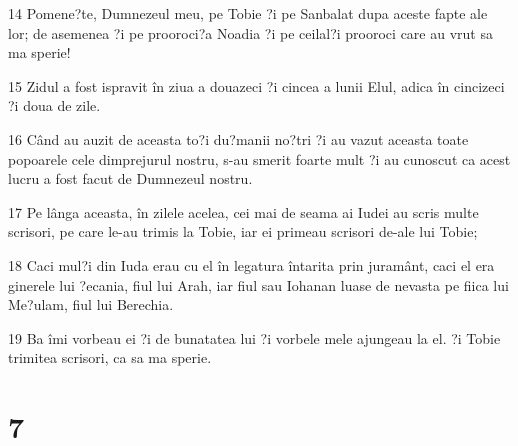 \par 14 Pomene?te, Dumnezeul meu, pe Tobie ?i pe Sanbalat dupa aceste fapte ale lor; de asemenea ?i pe prooroci?a Noadia ?i pe ceilal?i prooroci care au vrut sa ma sperie!
\par 15 Zidul a fost ispravit în ziua a douazeci ?i cincea a lunii Elul, adica în cincizeci ?i doua de zile.
\par 16 Când au auzit de aceasta to?i du?manii no?tri ?i au vazut aceasta toate popoarele cele dimprejurul nostru, s-au smerit foarte mult ?i au cunoscut ca acest lucru a fost facut de Dumnezeul nostru.
\par 17 Pe lânga aceasta, în zilele acelea, cei mai de seama ai Iudei au scris multe scrisori, pe care le-au trimis la Tobie, iar ei primeau scrisori de-ale lui Tobie;
\par 18 Caci mul?i din Iuda erau cu el în legatura întarita prin juramânt, caci el era ginerele lui ?ecania, fiul lui Arah, iar fiul sau Iohanan luase de nevasta pe fiica lui Me?ulam, fiul lui Berechia.
\par 19 Ba îmi vorbeau ei ?i de bunatatea lui ?i vorbele mele ajungeau la el. ?i Tobie trimitea scrisori, ca sa ma sperie.

\chapter{7}

